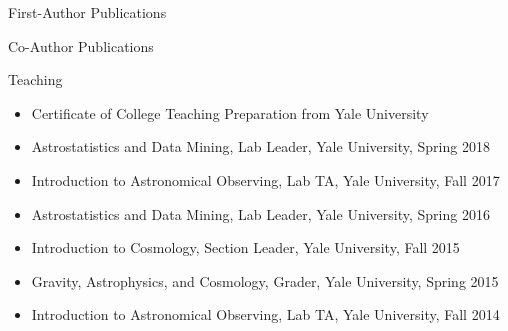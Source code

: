 \documentclass{resume}
\begin{document}
\begin{refsection}
  \begin{rSection}{First-Author Publications}
    \setlength{\leftskip}{0.5cm}
    \nocite{Lange2020_arXiv_2011_2377, Lange2019_MNRAS_490_1870, Lange2019_MNRAS_488_5771, Lange2019_MNRAS_487_3112, Lange2019_MNRAS_482_4824, Lange2018_MNRAS_473_2830, Lange2016_ApJ_819_4, Lange2015_MNRAS_447_939, Lange2013_AA_551_89}
    \printbibliography[heading=none]
  \end{rSection}
\end{refsection}

\begin{rSection}{Co-Author Publications}
  \setlength{\leftskip}{0.5cm}
  \nocite{Wang2020_MNRAS_498_4450, vandenBosch2019_MNRAS_488_4984, Wang2019_MNRAS_488_3541, Zentner2019_MNRAS_485_1196, Villarreal2017_MNRAS_472_1088, Campbell2018_MNRAS_477_359, Momcheva2016_ApJS_225_27, Nelson2016_ApJ_828_27}
  \printbibliography[heading=none]
\end{rSection}

\begin{rSection}{Teaching}
  \begin{itemize}[leftmargin=1.0cm, topsep=0pt, itemsep=0pt, partopsep=0pt, parsep=0pt]
    \item Certificate of College Teaching Preparation from Yale University
    \item Astrostatistics and Data Mining, Lab Leader, Yale University, Spring 2018
    \item Introduction to Astronomical Observing, Lab TA, Yale University, Fall 2017
    \item Astrostatistics and Data Mining, Lab Leader, Yale University, Spring 2016
    \item Introduction to Cosmology, Section Leader, Yale University, Fall 2015
    \item Gravity, Astrophysics, and Cosmology, Grader, Yale University, Spring 2015
    \item Introduction to Astronomical Observing, Lab TA, Yale University, Fall 2014
  \end{itemize}
\end{rSection}
\end{document}
